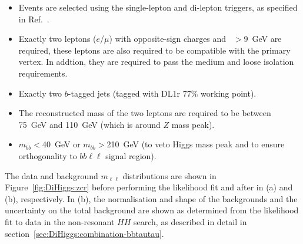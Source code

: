 \begin{itemize}

    \item Events are selected using the single-lepton and di-lepton triggers, 
    as specified in Ref.~\cite{HDBS-2018-33}.
    \item Exactly two leptons ($e$/$\mu$) with opposite-sign charges 
    and \pt\ $>$9~GeV are required, these leptons are also required
    to be compatible with the primary vertex. In addtion, they are required
    to pass the medium and loose isolation requirements.
    \item Exactly two $b$-tagged jets (tagged with DL1r 77\% working point).
    \item The reconstructed mass of the two leptons are required to be between 75~GeV
    and 110~GeV (which is around $Z$ mass peak).
    \item $m_{bb}<$40~GeV or $m_{bb}>$210~GeV 
    (to veto Higgs mass peak and to ensure orthogonality to $bb\ell\ell$ signal region).

\end{itemize}

The data and background $m_{\ell\ell}$ distributions are shown in Figure~\ref{fig:DiHiggs:zcr}
before performing the likelihood fit and after in (a) and (b), respectively.
In (b), the normalisation and shape of the backgrounds 
and the uncertainty on the total background are shown as determined 
from the likelihood fit to data in the non-resonant $HH$ search, as 
described in detail in section~\ref{sec:DiHiggs:combination-bbtautau}. 

